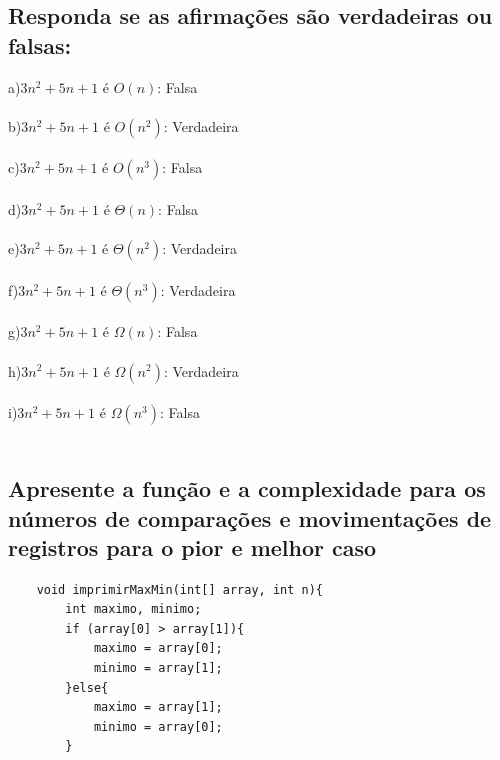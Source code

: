 \documentclass[12pt]{article}
\begin{document}
{\subsection{Responda se as afirmações são verdadeiras ou falsas:}
a)$3n^2 + 5n + 1$ é $O(n)$: Falsa\\\\
b)$3n^2 + 5n + 1$ é $O(n^2)$: Verdadeira\\\\
c)$3n^2 + 5n + 1$ é $O(n^3)$: Falsa\\\\
d)$3n^2 + 5n + 1$ é $\Theta(n)$: Falsa\\\\
e)$3n^2 + 5n + 1$ é $\Theta(n^2)$: Verdadeira\\\\
f)$3n^2 + 5n + 1$ é $\Theta(n^3)$: Verdadeira\\\\
g)$3n^2 + 5n + 1$ é $\Omega(n)$: Falsa\\\\
h)$3n^2 + 5n + 1$ é $\Omega(n^2)$: Verdadeira\\\\
i)$3n^2 + 5n + 1$ é $\Omega(n^3)$: Falsa\\\\

\subsection{Apresente a função e a complexidade para os números de comparações e movimentações de registros para o pior e melhor caso}
\begin{lstlisting}
    void imprimirMaxMin(int[] array, int n){
        int maximo, minimo;
        if (array[0] > array[1]){
            maximo = array[0];
            minimo = array[1];
        }else{
            maximo = array[1];
            minimo = array[0];
        }
        

\end{lstlisting}}
\end{document}

